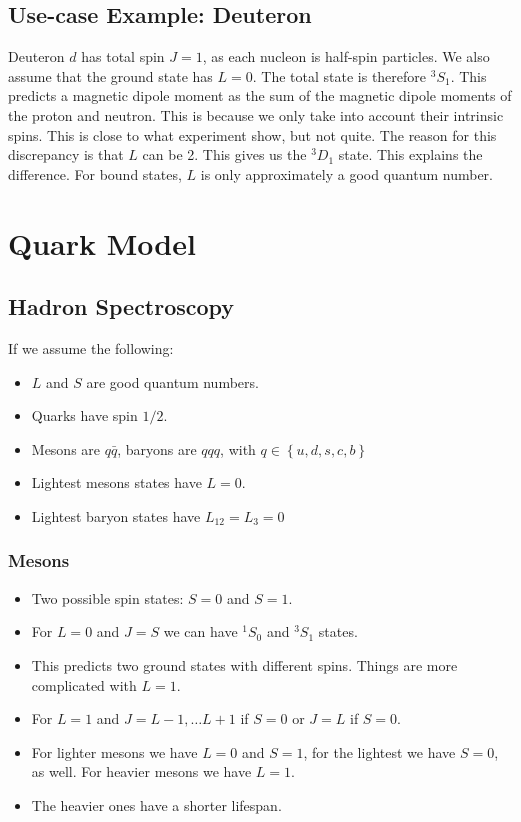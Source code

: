 \subsection{Use-case Example: Deuteron}
Deuteron $d$ has total spin $J = 1$, as each nucleon is half-spin particles. We also assume that the ground state has $L = 0$. The total state is therefore $^{3}S_1$. This predicts a magnetic dipole moment as the sum of the magnetic dipole moments of the proton and neutron. This is because we only take into account their intrinsic spins. This is close to what experiment show, but not quite. The reason for this discrepancy is that $L$ can be 2. This gives us the $^{3}D_1$ state. This explains the difference. For bound states, $L$ is only approximately a good quantum number. 

\section{Quark Model}
\subsection{Hadron Spectroscopy}
If we assume the following:
\begin{itemize}
    \item $L$ and $S$ are good quantum numbers. 
    \item Quarks have spin $1/2$.
    \item Mesons are $q \bar{q}$, baryons are $qqq$, with $q ∈ \left\{u, d, s, c, b\right\}$
    \item Lightest mesons states have $L = 0$. 
    \item Lightest baryon states have $L_{12} = L_3 = 0$
\end{itemize}
\subsubsection{Mesons}
\begin{itemize}
    \item Two possible spin states: $S = 0$ and $S = 1$.
    \item For $L = 0$ and $J = S$ we can have $^{1}S_0$ and $^{3}S_1$ states.
    \item This predicts two ground states with different spins. Things are more complicated with $L = 1$. 
    \item For $L = 1$ and $J = L - 1, \ldots  L +1$ if $S = 0$ or $J = L$ if $S = 0$. 
    \item For lighter mesons we have $L = 0$ and $S = 1$, for the lightest we have $S = 0$, as well. For heavier mesons we have $L = 1$. 
    \item The heavier ones have a shorter lifespan. 
\end{itemize}

